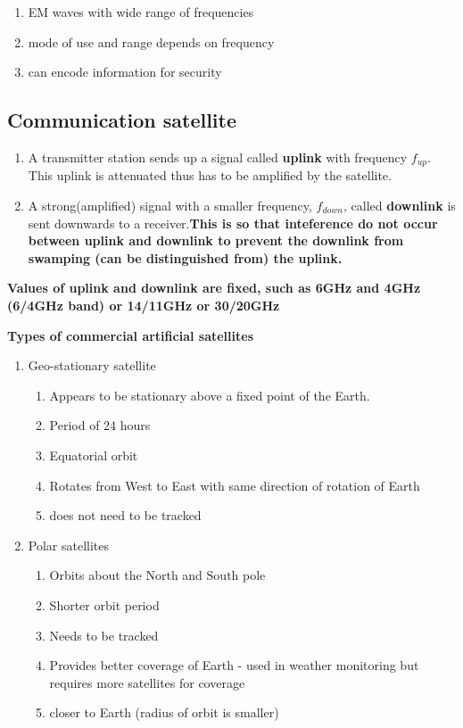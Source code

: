 \documentclass{article}
\begin{document}
\begin{enumerate}
    \item EM waves with wide range of frequencies
    \item mode of use and range depends on frequency
    \item can encode information for security
\end{enumerate}
\newpage


\subsection{Communication satellite}

\begin{enumerate}
    \item A transmitter station sends up a signal called \textbf{uplink} with frequency $f_{up}$. This uplink is attenuated thus has to be amplified by the satellite. 
    \item A strong(amplified) signal with a smaller frequency, $f_{down}$, called \textbf{downlink} is sent downwards to a receiver.\textbf{This is so that inteference do not occur between uplink and downlink to prevent the downlink from swamping (can be distinguished from) the uplink.}
\end{enumerate}
\textbf{Values of uplink and downlink are fixed, such as 6GHz and 4GHz (6/4GHz band) or 14/11GHz or 30/20GHz}

\begin{flushleft}
\item \textbf{Types of commercial artificial satellites}
\end{flushleft}
\begin{enumerate}
    \item Geo-stationary satellite 
    \begin{enumerate}
        \item Appears to be stationary above a fixed point of the Earth.
        \item Period of 24 hours
        \item Equatorial orbit
        \item Rotates from West to East with same direction of rotation of Earth
        \item does not need to be tracked
    \end{enumerate}
    \item Polar satellites
    \begin{enumerate}
        \item Orbits about the North and South pole
        \item Shorter orbit period
        \item Needs to be tracked
        \item Provides better coverage of Earth - used in weather monitoring but requires more satellites for coverage
        \item closer to Earth (radius of orbit is smaller)
    \end{enumerate}
\end{enumerate}
\end{document}
